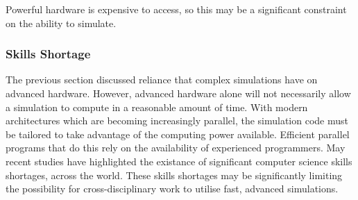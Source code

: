 \documentclass{UoYCSproject}
\begin{document}
Powerful hardware is expensive to access, so this may be a significant constraint on the ability to simulate.





\subsubsection{Skills Shortage}
\label{skills_shortage}
The previous section discussed reliance that complex simulations have on advanced hardware. However, advanced hardware alone will not necessarily allow a simulation to compute in a reasonable amount of time. 
With modern architectures which are becoming increasingly parallel, the simulation code must be tailored to take advantage of the computing power available. Efficient parallel programs that do this rely on the availability of experienced programmers. May recent studies have highlighted the existance of significant computer science skills shortages, across the world\cite{digital_skills_uk, microsoft_blog}. These skills shortages may be significantly limiting the possibility for cross-disciplinary work to utilise fast, advanced simulations.


\end{document}
